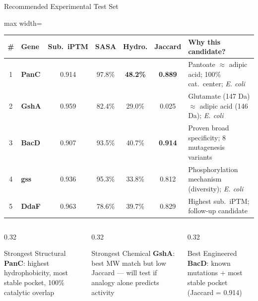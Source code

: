 \documentclass[aspectratio=169, 11pt]{beamer}
\begin{document}
\begin{frame}{Recommended Experimental Test Set}
\vspace{-6pt}

\begin{center}
\begin{adjustbox}{max width=\textwidth}
\small
\begin{tabular}{clccccl}
\toprule
\textbf{\#} & \textbf{Gene} & \textbf{Sub.\ iPTM} & \textbf{SASA} & \textbf{Hydro.} & \textbf{Jaccard} & \textbf{Why this candidate?} \\
\midrule
1 & \textbf{PanC} & 0.914 & 97.8\% & \textbf{48.2\%} & \textbf{0.889} & Pantoate $\approx$ adipic acid; 100\% cat.\ center; \textit{E. coli} \\
2 & \textbf{GshA} & 0.959 & 82.4\% & 29.0\% & \textcolor{accentred}{0.025} & Glutamate (147 Da) $\approx$ adipic acid (146 Da); \textit{E. coli} \\
3 & \textbf{BacD} & 0.907 & 93.5\% & 40.7\% & \textbf{0.914} & Proven broad specificity; 8 mutagenesis variants \\
4 & \textbf{gss} & 0.936 & 95.3\% & 33.8\% & 0.812 & Phosphorylation mechanism (diversity); \textit{E. coli} \\
5 & \textbf{DdaF} & 0.963 & 78.6\% & 39.7\% & 0.829 & Highest sub.\ iPTM; follow-up candidate \\
\bottomrule
\end{tabular}
\end{adjustbox}
\end{center}

\vspace{4pt}
\begin{columns}[T]
\begin{column}{0.32\textwidth}
\begin{exampleblock}{\small Strongest Structural}
\centering\small
\textbf{PanC}: highest hydrophobicity, most stable pocket, 100\% catalytic overlap
\end{exampleblock}
\end{column}
\begin{column}{0.32\textwidth}
\begin{alertblock}{\small Strongest Chemical}
\centering\small
\textbf{GshA}: best MW match but low Jaccard --- will test if analogy alone predicts activity
\end{alertblock}
\end{column}
\begin{column}{0.32\textwidth}
\begin{block}{\small Best Engineered}
\centering\small
\textbf{BacD}: known mutations + most stable pocket (Jaccard = 0.914)
\end{block}
\end{column}
\end{columns}


\end{frame}
\end{document}
